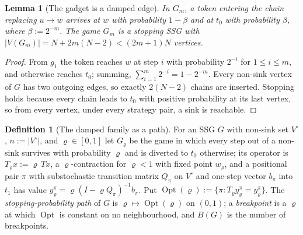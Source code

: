 \documentclass[11pt]{article}
\theoremstyle{plain}
\newtheorem{lemma}[theorem]{Lemma}
\theoremstyle{definition}
\newtheorem{definition}[theorem]{Definition}
\DeclareMathOperator{\Opt}{Opt}
\begin{document}
\begin{lemma}[The gadget is a damped edge]\label{lem:gadget}
In $G_m$, a token entering the chain replacing $u\to w$ arrives at $w$
with probability $1-\beta$ and at $t_0$ with probability $\beta$, where
$\beta:=2^{-m}$. The game $G_m$ is a stopping SSG with
$|V(G_m)| = N + 2m(N-2) < (2m+1)N$ vertices.
\end{lemma}

\begin{proof}
From $g_1$ the token reaches $w$ at step $i$ with probability $2^{-i}$
for $1\le i\le m$, and otherwise reaches $t_0$; summing,
$\sum_{i=1}^{m}2^{-i}=1-2^{-m}$. Every non-sink vertex of $G$ has two
outgoing edges, so exactly $2(N-2)$ chains are inserted. Stopping holds
because every chain leads to $t_0$ with positive probability at its last
vertex, so from every vertex, under every strategy pair, a sink is
reachable.
\end{proof}

\begin{definition}[The damped family as a path]\label{def:discount-path}
For an SSG $G$ with non-sink set $V^{\circ}$, $n:=|V^{\circ}|$, and
$\varrho\in[0,1]$ let $G_{\varrho}$ be the game in which every step out of
a non-sink survives with probability $\varrho$ and is diverted to $t_0$
otherwise; its operator is $T_{\varrho}x:=\varrho\,Tx$, a
$\varrho$-contraction for $\varrho<1$ with fixed point $w_{\varrho}$, and a
positional pair $\pi$ with substochastic transition matrix $Q_\pi$ on
$V^{\circ}$ and one-step vector $b_\pi$ into $t_1$ has value
$y^{\pi}_{\varrho}=\varrho(I-\varrho Q_\pi)^{-1}b_\pi$. Put
$\Opt(\varrho):=\{\pi:T_{\varrho}y^{\pi}_{\varrho}=y^{\pi}_{\varrho}\}$. The
\emph{stopping-probability path} of $G$ is $\varrho\mapsto\Opt(\varrho)$ on
$(0,1)$; a \emph{breakpoint} is a $\varrho$ at which $\Opt$ is constant on
no neighbourhood, and $B(G)$ is the number of breakpoints.
\end{definition}
\end{document}
